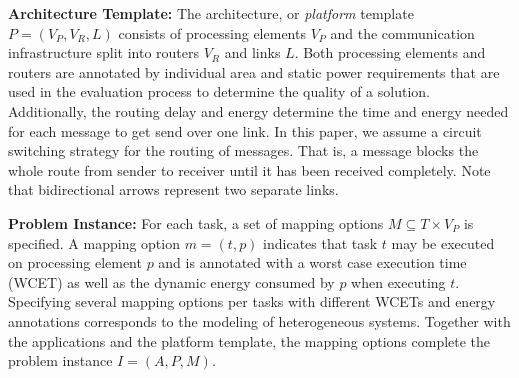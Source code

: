 \textbf{Architecture Template: }
The architecture, or \emph{platform} template $P=(V_P,V_R,L)$ consists of processing elements $V_P$ and the communication infrastructure split into routers $V_R$ and links $L$. Both processing elements and routers are annotated by individual area and static power requirements that are used in the evaluation process to determine the quality of a solution. Additionally, the routing delay and energy determine the time and energy needed for each message to get send over one link. 
In this paper, we assume a circuit switching strategy for the routing of messages. That is, a message blocks the whole route from sender to receiver until it has been received completely. 
Note that bidirectional arrows represent two separate links. %

\textbf{Problem Instance: }
For each task, a set of mapping options $M\subseteq T\times V_P$ is specified. A mapping option $m=(t,p)$ indicates that task $t$ may be executed on processing element $p$ and is annotated with a worst case execution time (WCET) as well as the dynamic energy consumed by $p$ when executing $t$. Specifying several mapping options per tasks with different WCETs and energy annotations corresponds to the modeling of heterogeneous systems.  Together with the applications and the platform template, the mapping options complete the problem instance $I=(A,P,M)$.\par

